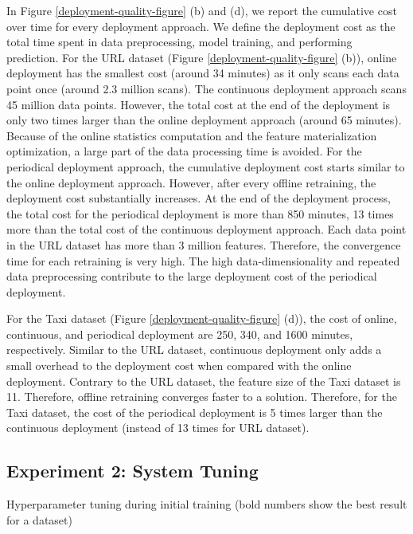 In Figure \ref{deployment-quality-figure} (b) and (d), we report the cumulative cost over time for every deployment approach.
We define the deployment cost as the total time spent in data preprocessing, model training, and performing prediction.
For the URL dataset (Figure \ref{deployment-quality-figure} (b)), online deployment has the smallest cost (around 34 minutes) as it only scans each data point once (around 2.3 million scans).  
The continuous deployment approach scans 45 million data points.
However, the total cost at the end of the deployment is only two times larger than the online deployment approach (around 65 minutes).  
Because of the online statistics computation and the feature materialization optimization, a large part of the data processing time is avoided.
For the periodical deployment approach, the cumulative deployment cost starts similar to the online deployment approach.
However, after every offline retraining, the deployment cost substantially increases.
At the end of the deployment process, the total cost for the periodical deployment is more than 850 minutes, 13 times more than the total cost of the continuous deployment approach.
Each data point in the URL dataset has more than 3 million features.
Therefore, the convergence time for each retraining is very high.
The high data-dimensionality and repeated data preprocessing contribute to the large deployment cost of the periodical deployment.

For the Taxi dataset (Figure \ref{deployment-quality-figure} (d)), the cost of online, continuous, and periodical deployment are 250, 340, and 1600 minutes, respectively.
Similar to the URL dataset, continuous deployment only adds a small overhead to the deployment cost when compared with the online deployment.
Contrary to the URL dataset, the feature size of the Taxi dataset is 11.
Therefore, offline retraining converges faster to a solution.
Therefore, for the Taxi dataset, the cost of the periodical deployment is 5 times larger than the continuous deployment (instead of 13 times for URL dataset). 

\subsection{Experiment 2: System Tuning}
\begin{table*}[t]
\centering
\begin{adjustbox}{max width=\textwidth}

\end{adjustbox}
\caption{Hyperparameter tuning during initial training (bold numbers show the best result for a dataset)}
\label{hyper-param-table}
\end{table*}

